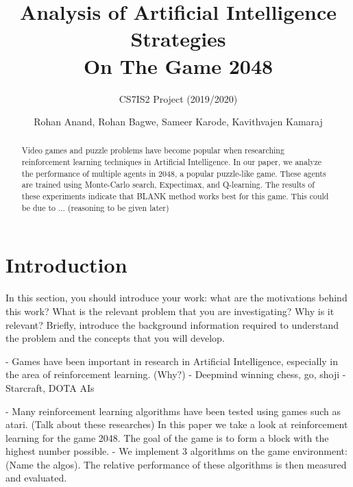 \documentclass{svproc}
\begin{document}
    \mainmatter
    \title{Analysis of Artificial Intelligence Strategies\\On The Game 2048
    }
    \subtitle{CS7IS2 Project (2019/2020)}
    \author{Rohan Anand, Rohan Bagwe, Sameer Karode, Kavithvajen Kamaraj}


    \maketitle

    \begin{abstract}
        Video games and puzzle problems have become popular when researching reinforcement learning techniques in Artificial Intelligence. In our paper, we analyze the performance of multiple agents in 2048, a popular puzzle-like game. These agents are trained using Monte-Carlo search, Expectimax, and Q-learning. The results of these experiments indicate that BLANK method works best for this game. This could be due to ... (reasoning to be given later)
    \end{abstract}

    \section{Introduction}
    In this section, you should introduce your work: what are the motivations behind this work? What is the relevant problem that you are investigating? Why is it relevant?
    Briefly, introduce the background information required to understand the problem and the concepts that you will develop.

    - Games have been important in research in Artificial Intelligence, especially in the area of reinforcement learning. (Why?)
    - Deepmind winning chess, go, shoji
    - Starcraft, DOTA AIs

    - Many reinforcement learning algorithms have been tested using games such as atari. (Talk about these researches)
    In this paper we take a look at reinforcement learning for the game 2048. The goal of the game is to form a block with the highest number possible. 
    - We implement 3 algorithms on the game environment: (Name the algos). The relative performance of these algorithms is then measured and evaluated.
\end{document}
